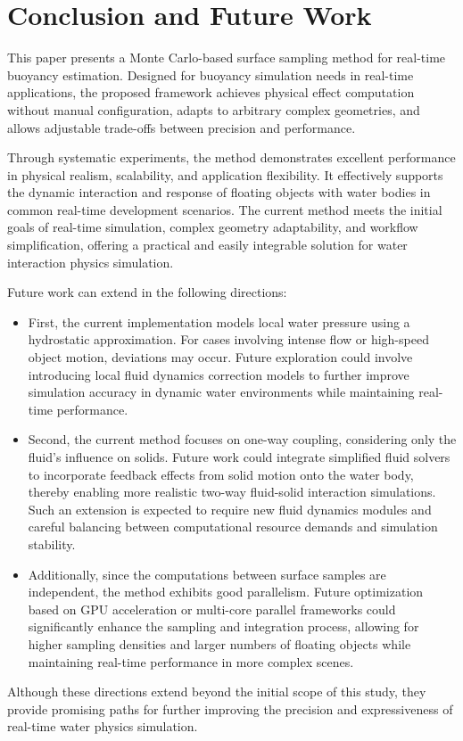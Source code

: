 \section{Conclusion and Future Work}

This paper presents a Monte Carlo-based surface sampling method for real-time buoyancy estimation. Designed for buoyancy simulation needs in real-time applications, the proposed framework achieves physical effect computation without manual configuration, adapts to arbitrary complex geometries, and allows adjustable trade-offs between precision and performance.

Through systematic experiments, the method demonstrates excellent performance in physical realism, scalability, and application flexibility. It effectively supports the dynamic interaction and response of floating objects with water bodies in common real-time development scenarios. The current method meets the initial goals of real-time simulation, complex geometry adaptability, and workflow simplification, offering a practical and easily integrable solution for water interaction physics simulation.

Future work can extend in the following directions:

\begin{itemize}
	\item First, the current implementation models local water pressure using a hydrostatic approximation. For cases involving intense flow or high-speed object motion, deviations may occur. Future exploration could involve introducing local fluid dynamics correction models to further improve simulation accuracy in dynamic water environments while maintaining real-time performance.

	\item Second, the current method focuses on one-way coupling, considering only the fluid’s influence on solids. Future work could integrate simplified fluid solvers to incorporate feedback effects from solid motion onto the water body, thereby enabling more realistic two-way fluid-solid interaction simulations. Such an extension is expected to require new fluid dynamics modules and careful balancing between computational resource demands and simulation stability.

	\item Additionally, since the computations between surface samples are independent, the method exhibits good parallelism. Future optimization based on GPU acceleration or multi-core parallel frameworks could significantly enhance the sampling and integration process, allowing for higher sampling densities and larger numbers of floating objects while maintaining real-time performance in more complex scenes.
\end{itemize}

Although these directions extend beyond the initial scope of this study, they provide promising paths for further improving the precision and expressiveness of real-time water physics simulation.
